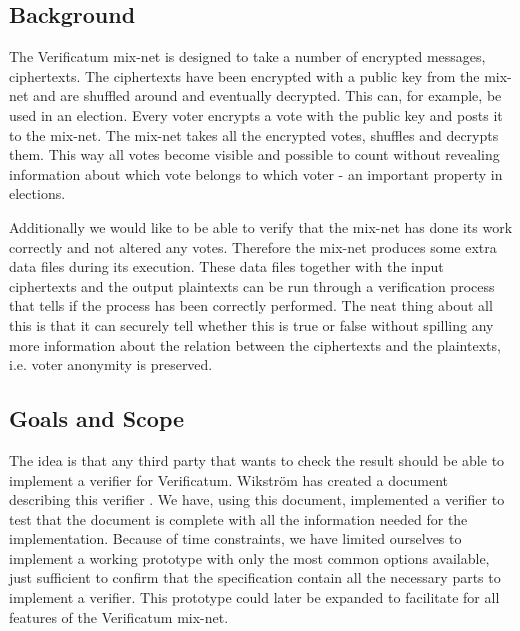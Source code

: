 \subsection{Background}

The Verificatum mix-net is designed to take a number of encrypted
messages, ciphertexts. The ciphertexts have been encrypted with a
public key from the mix-net and are shuffled around and eventually
decrypted. This can, for example, be used in an election. Every voter
encrypts a vote with the public key and posts it to the mix-net. The
mix-net takes all the encrypted votes, shuffles and decrypts
them. This way all votes become visible and possible to count without
revealing information about which vote belongs to which voter - 
an important property in elections.

Additionally we would like to be able to verify that the mix-net has
done its work correctly and not altered any votes. Therefore the
mix-net produces some extra data files during its execution. These
data files together with the input ciphertexts and the output
plaintexts can be run through a verification process that tells if the
process has been correctly performed. The neat thing about all this is
that it can securely tell whether this is true or false without
spilling any more information about the relation between the
ciphertexts and the plaintexts, i.e. voter anonymity is preserved.

\subsection{Goals and Scope}

The idea is that any third party that wants to check the result should
be able to implement a verifier for Verificatum. Wikström has created
a document describing this verifier \cite{wikstrom1}. We have, using
this document, implemented a verifier to test that the document is
complete with all the information needed for the
implementation. Because of time constraints, we have limited ourselves
to implement a working prototype with only the most common options
available, just sufficient to confirm that the specification contain
all the necessary parts to implement a verifier. This prototype could
later be expanded to facilitate for all features of the Verificatum
mix-net.
